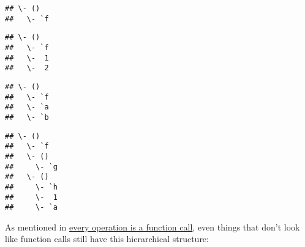\begin{itemize}
\begin{Shaded}
\begin{Highlighting}[]
\NormalTok{(}\NormalTok{())}
\end{Highlighting}
\end{Shaded}

\begin{verbatim}
## \- ()
##   \- `f
\end{verbatim}

\begin{Shaded}
\begin{Highlighting}[]
\NormalTok{(}\NormalTok{(}\NormalTok{, }\NormalTok{))}
\end{Highlighting}
\end{Shaded}

\begin{verbatim}
## \- ()
##   \- `f
##   \-  1
##   \-  2
\end{verbatim}

\begin{Shaded}
\begin{Highlighting}[]
\NormalTok{(}
\end{Highlighting}
\end{Shaded}

\begin{verbatim}
## \- ()
##   \- `f
##   \- `a
##   \- `b
\end{verbatim}

\begin{Shaded}
\begin{Highlighting}[]
\NormalTok{(}\NormalTok{(}\NormalTok{(), }\NormalTok{(}
\end{Highlighting}
\end{Shaded}

\begin{verbatim}
## \- ()
##   \- `f
##   \- ()
##     \- `g
##   \- ()
##     \- `h
##     \-  1
##     \- `a
\end{verbatim}

  As mentioned in \protect\hyperlink{all-calls}{every operation is a
  function call}, even things that don't look like function calls still
  have this hierarchical structure:

\begin{Shaded}
\begin{Highlighting}[]
\OperatorTok{+}\StringTok{ }
\end{Highlighting}
\end{Shaded}


\end{itemize}
